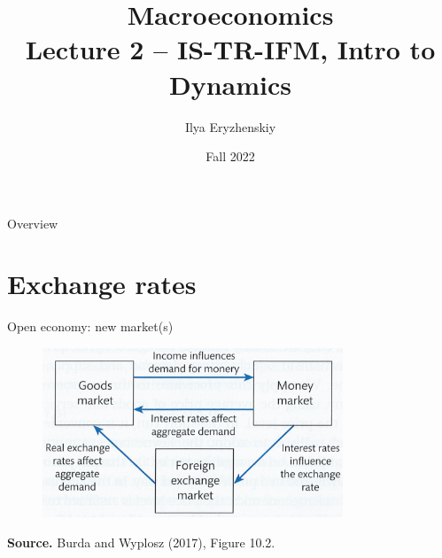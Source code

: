 \documentclass{beamer}
\title[PSME]{Macroeconomics\\ Lecture 2 -- IS-TR-IFM, Intro to Dynamics}
\author[I. Eryzhenskiy]{Ilya Eryzhenskiy}
\institute[BdF]{PSME Panth\'{e}on-Sorbonne Master in Economics}
\date[PSME macro]{Fall 2022}
\begin{document}
\begin{frame}
  \maketitle
\end{frame}

\begin{frame}{Overview}
  \tableofcontents
\end{frame}

\section{Exchange rates}
\begin{frame}
\tableofcontents[currentsection]
\end{frame}

\begin{frame}{Open economy: new market(s)}
  \begin{figure}
	\centering
	\includegraphics[width=0.8\textwidth]{FIGURES/6_GE.png}
  \end{figure}
\begin{minipage}{1.0\columnwidth}
\tiny	
\textbf{Source.} Burda and Wyplosz (2017), Figure 10.2.\\
\end{minipage}
\end{frame}
\end{document}
